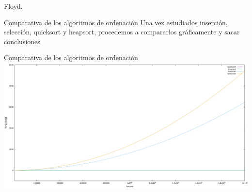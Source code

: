 \documentclass[10pt, xcolor=table]{beamer}
\begin{document}
\begin{frame}{Floyd.
}
\begin{table}[h!]
	\centering
	\footnotesize
		\caption{Experiencia empírica de algoritmo de Floyd sin optimizar}
\end{table}
\end{frame}

\begin{frame}{Comparativa de los algoritmos de ordenación}
Una vez estudiados inserción, selección, quicksort y heapsort, procedemos a compararlos gráficamente y sacar conclusiones
\end{frame}

\begin{frame}[fragile]{Comparativa de los algoritmos de ordenación}
\centering
\includegraphics[scale=0.2]{../../Images/Gráfica comparativa algoritmos de ordenación Joshoccas.png}
\end{frame}
\end{document}
